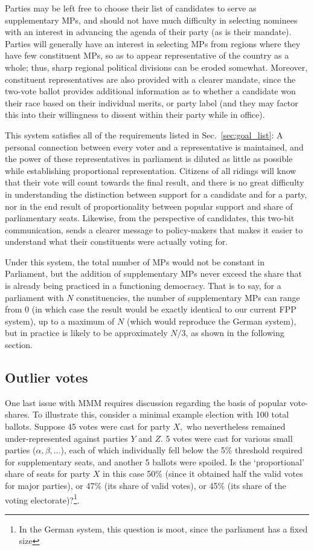 \documentclass[DIV=calc, paper=a4, fontsize=11pt, twocolumn]{scrartcl}	 %
\begin{document}
Parties may be left free to choose their list of candidates to serve as supplementary MPs, and should not have much difficulty in selecting nominees with an interest in advancing the agenda of their party (as is their mandate). Parties will generally have an interest in selecting MPs from regions where they have few constituent MPs, so as to appear representative of the country as a whole; thus, sharp regional political divisions can be eroded somewhat.
Moreover, constituent representatives are also provided with a clearer mandate, since the two-vote ballot provides additional information as to whether a candidate won their race based on their individual merits, or party label (and they may factor this into their willingness to dissent within their party while in office).



This system satisfies all of the requirements listed in Sec.~\ref{sec:goal_list}: A personal connection between every voter and a representative is maintained, and the power of these representatives in parliament is diluted as little as possible while establishing proportional representation. 
Citizens of all ridings will know that their vote will count towards the final result, and there is no great difficulty in understanding the  distinction between support for a candidate and for a party, nor in the end result of proportionality between popular support and share of parliamentary seats.
Likewise, from the perspective of candidates, this two-bit communication, sends a clearer message to policy-makers that makes it easier to understand what their constituents were actually voting for.

Under this system, the total number of MPs would not be constant in Parliament, but the addition of supplementary MPs never exceed the share that is already being practiced in a functioning democracy. That is to say, for a parliament with $N$ constituencies, the number of supplementary MPs can range from 0 (in which case the result would be exactly identical to our current FPP system), up to a maximum of $N$ (which would reproduce the German system), but in practice is likely to be approximately $N/3$, as shown in the following section.

\subsection{Outlier votes}
One last issue with MMM requires discussion regarding the basis of popular vote-shares. To illustrate this, consider a minimal example election with 100 total ballots. Suppose 45 votes were cast for party $X,$ who nevertheless remained under-represented against parties $Y$ and $Z$. 5 votes were cast for various small parties ($\alpha,\beta,\ldots$), each of which individually fell below the 5\% threshold required for supplementary seats, and another 5 ballots were spoiled. 
Is the `proportional' share of seats for party $X$ in this case 50\% (since it obtained half the valid votes for major parties), or 47\% (its share of valid votes), or 45\% (its share of the voting electorate)?\footnote{ In the German system, this question is moot, since the parliament has a fixed size}.
\end{document}
